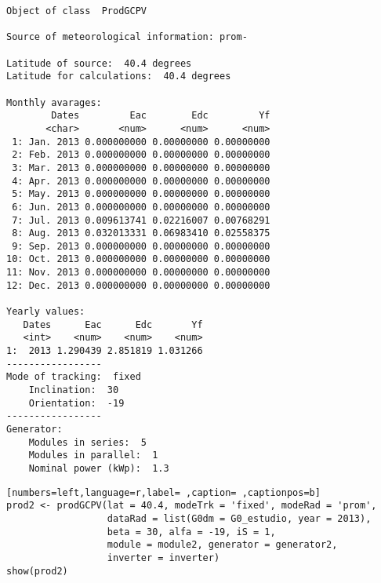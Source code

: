 \begin{verbatim}
Object of class  ProdGCPV 

Source of meteorological information: prom- 

Latitude of source:  40.4 degrees
Latitude for calculations:  40.4 degrees

Monthly avarages:
        Dates         Eac        Edc         Yf
       <char>       <num>      <num>      <num>
 1: Jan. 2013 0.000000000 0.00000000 0.00000000
 2: Feb. 2013 0.000000000 0.00000000 0.00000000
 3: Mar. 2013 0.000000000 0.00000000 0.00000000
 4: Apr. 2013 0.000000000 0.00000000 0.00000000
 5: May. 2013 0.000000000 0.00000000 0.00000000
 6: Jun. 2013 0.000000000 0.00000000 0.00000000
 7: Jul. 2013 0.009613741 0.02216007 0.00768291
 8: Aug. 2013 0.032013331 0.06983410 0.02558375
 9: Sep. 2013 0.000000000 0.00000000 0.00000000
10: Oct. 2013 0.000000000 0.00000000 0.00000000
11: Nov. 2013 0.000000000 0.00000000 0.00000000
12: Dec. 2013 0.000000000 0.00000000 0.00000000

Yearly values:
   Dates      Eac      Edc       Yf
   <int>    <num>    <num>    <num>
1:  2013 1.290439 2.851819 1.031266
-----------------
Mode of tracking:  fixed 
    Inclination:  30 
    Orientation:  -19 
-----------------
Generator:
    Modules in series:  5 
    Modules in parallel:  1 
    Nominal power (kWp):  1.3
\end{verbatim}

\begin{lstlisting}[numbers=left,language=r,label= ,caption= ,captionpos=b]
prod2 <- prodGCPV(lat = 40.4, modeTrk = 'fixed', modeRad = 'prom',
                  dataRad = list(G0dm = G0_estudio, year = 2013),
                  beta = 30, alfa = -19, iS = 1,
                  module = module2, generator = generator2,
                  inverter = inverter)
show(prod2)
\end{lstlisting}

